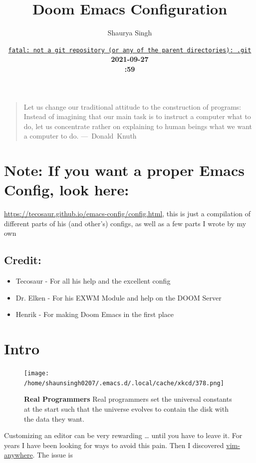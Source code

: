 \documentclass{scrartcl}
\author{Shaurya Singh}
\date{\href{https://github.com/shaunsingh/vimrc-dotfiles/commit/fatal: not a git repository (or any of the parent directories): .git}{\normalsize\texttt{fatal: not a git repository (or any of the parent directories): .git}}\\\Large\bfseries 2021-09-27 \\\normalsize\mdseries12:59 \acr{\lowercase{EDT}}}
\title{Doom Emacs Configuration}
\begin{document}
\maketitle
\tableofcontents

\begin{quote}
Let us change our traditional attitude to the construction of programs:
Instead of imagining that our main task is to instruct a computer what to do,
let us concentrate rather on explaining to human beings what we want a
computer to do. \mbox{--- Donald Knuth}
\end{quote}

\section{\textbf{Note:} If you want a proper Emacs Config, look here:}
\label{sec:orgb8701b5}
\url{https://tecosaur.github.io/emacs-config/config.html}, this is just a compilation
of different parts of his (and other's) configs, as well as a few parts I wrote
by my own

\subsection{Credit:}
\label{sec:orga80ef6d}
\begin{itemize}
\item Tecosaur - For all his help and the excellent config
\item Dr. Elken - For his EXWM Module and help on the DOOM Server
\item Henrik - For making Doom Emacs in the first place
\end{itemize}

\section{Intro}
\label{sec:orge8dce45}
\begin{figure}[!htb]
	  \centering
	  \texttt{[image: /home/shaunsingh0207/.emacs.d/.local/cache/xkcd/378.png]}
  \caption*{\label{xkcd:378} \textbf{Real Programmers} Real programmers set the universal constants at the start such that the universe evolves to contain the disk with the data they want.}
	\end{figure}

Customizing an editor can be very rewarding \ldots{} until you have to leave it.
For years I have been looking for ways to avoid this pain.
Then I discovered \href{https://github.com/cknadler/vim-anywhere}{vim-anywhere}. The issue is
\end{document}
